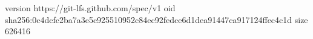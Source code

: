 version https://git-lfs.github.com/spec/v1
oid sha256:0c4dcfc2ba7a3e5c925510952c84ec92fedce6d1dea91447ca917124ffec4c1d
size 626416

